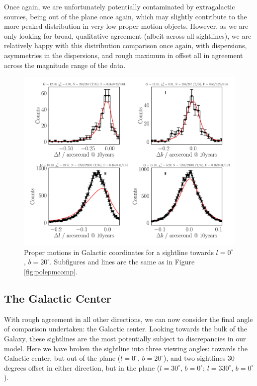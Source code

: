 \documentclass[fleqn,usenatbib]{mnras}
\begin{document}
Once again, we are unfortunately potentially contaminated by extragalactic sources, being out of the plane once again, which may slightly contribute to the more peaked distribution in very low proper motion objects.
However, as we are only looking for broad, qualitative agreement (albeit across all sightlines), we are relatively happy with this distribution comparison once again, with dispersions, asymmetries in the dispersions, and rough maximum in offset all in agreement across the magnitude range of the data.

\begin{figure}
    \centering
    \includegraphics[width=\columnwidth]{Plots/plots_pm_gaia_0_20.pdf}
    \caption{Proper motions in Galactic coordinates for a sightline towards $l = 0^\circ$, $b = 20^\circ$.
    Subfigures and lines are the same as in Figure \ref{fig:polepmcomp}.}
    \label{fig:l0comp}
\end{figure}

\subsection{The Galactic Center}
With rough agreement in all other directions, we can now consider the final angle of comparison undertaken: the Galactic center.
Looking towards the bulk of the Galaxy, these sightlines are the most potentially subject to discrepancies in our model.
Here we have broken the sightline into three viewing angles: towards the Galactic center, but out of the plane ($l = 0^\circ$, $b = 20^\circ$), and two sightlines 30 degrees offset in either direction, but in the plane ($l = 30^\circ$, $b = 0^\circ$; $l = 330^\circ$, $b = 0^\circ$).
\end{document}
